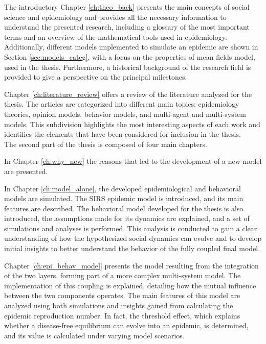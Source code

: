 The introductory Chapter \ref{ch:theo_back} presents the main concepts of social science and epidemiology and provides all the necessary information to understand the presented research, including a glossary of the most important terms and an overview of the mathematical tools used in epidemiology. Additionally,  different models implemented to simulate an epidemic are shown in Section \ref{sec:models_categ}, with a focus on the properties of mean fields model, used in the thesis. Furthermore, a historical background of the research field is provided to give a perspective on the principal milestones.

Chapter \ref{ch:literature_review} offers a review of the literature analyzed for the thesis. The articles are categorized into different main topics: epidemiology theories, opinion models, behavior models, and multi-agent and multi-system models. This subdivision highlights the most interesting aspects of each work and identifies the elements that have been considered for inclusion in the thesis.\\


\noindent The second part of the thesis is composed of four main chapters.

In Chapter \ref{ch:why_new} the reasons that led to the development of a new model are presented.

In Chapter \ref{ch:model_alone}, the developed epidemiological and behavioral models are simulated. The SIRS epidemic model is introduced, and its main features are described. The behavioral model developed for the thesis is also introduced, the assumptions made for its dynamics are explained, and a set of simulations and analyses is performed. This analysis is conducted to gain a clear understanding of how the hypothesized social dynamics can evolve and to develop initial insights to better understand the behavior of the fully coupled final model.

Chapter \ref{ch:epi_behav_model} presents the model resulting from the integration of the two layers, forming part of a more complex multi-system model. The implementation of this coupling is explained, detailing how the mutual influence between the two components operates. The main features of this model are analyzed using both simulations and insights gained from calculating the epidemic reproduction number. In fact, the threshold effect, which explains whether a disease-free equilibrium can evolve into an epidemic, is determined, and its value is calculated under varying model scenarios.

